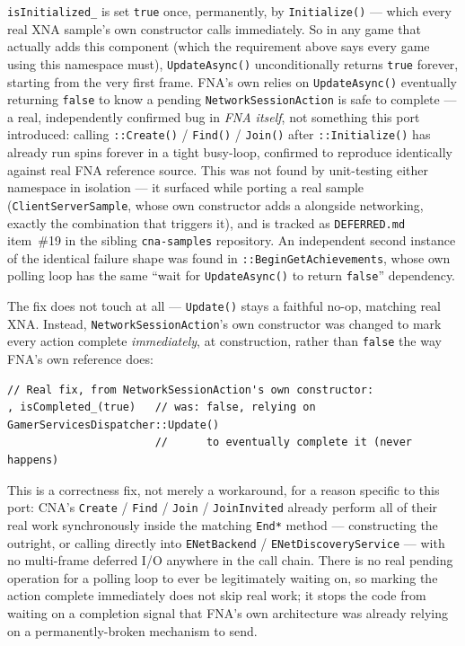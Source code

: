 \texttt{isInitialized\_} is set \texttt{true} once, permanently, by \texttt{Initialize()} ---
which every real XNA sample's own  constructor calls
immediately. So in any game that actually adds this component (which the requirement above says
every game using this namespace must), \texttt{UpdateAsync()} unconditionally returns
\texttt{true} forever, starting from the very first frame. FNA's own
 relies on \texttt{UpdateAsync()} eventually returning \texttt{false}
to know a pending \texttt{NetworkSessionAction} is safe to complete --- a real, independently
confirmed bug in \emph{FNA itself}, not something this port introduced: calling
\texttt{::Create()} / \texttt{Find()} / \texttt{Join()} after
\texttt{::Initialize()} has already run spins forever in a
tight busy-loop, confirmed to reproduce identically against real FNA reference source. This was
not found by unit-testing either namespace in isolation --- it surfaced while porting a real
sample (\texttt{ClientServerSample}, whose own constructor adds a
 alongside networking, exactly the combination that triggers
it), and is tracked as \texttt{DEFERRED.md} item~\#19 in the sibling \texttt{cna-samples}
repository. An independent second instance of the identical failure shape was found in
\texttt{::BeginGetAchievements}, whose own polling loop has the same
``wait for \texttt{UpdateAsync()} to return \texttt{false}'' dependency.

The fix does not touch  at all --- \texttt{Update()} stays a
faithful no-op, matching real XNA. Instead, \texttt{NetworkSessionAction}'s own constructor was
changed to mark every action complete \emph{immediately}, at construction, rather than
\texttt{false} the way FNA's own reference does:

\begin{lstlisting}
// Real fix, from NetworkSessionAction's own constructor:
, isCompleted_(true)   // was: false, relying on GamerServicesDispatcher::Update()
                       //      to eventually complete it (never happens)
\end{lstlisting}

This is a correctness fix, not merely a workaround, for a reason specific to this port: CNA's
\texttt{Create} / \texttt{Find} / \texttt{Join} / \texttt{JoinInvited} already perform all of
their real work synchronously inside the matching \texttt{End*} method --- constructing the
 outright, or calling directly into \texttt{ENetBackend} /
\texttt{ENetDiscoveryService} --- with no multi-frame deferred I/O anywhere in the call chain.
There is no real pending operation for a polling loop to ever be legitimately waiting on, so
marking the action complete immediately does not skip real work; it stops the code from waiting
on a completion signal that FNA's own architecture was already relying on a permanently-broken
mechanism to send.


